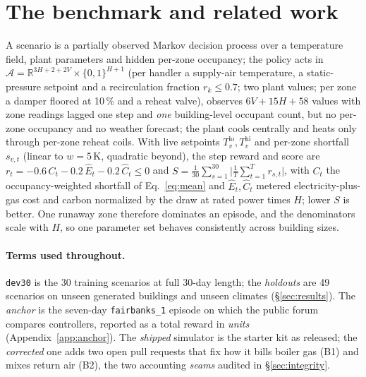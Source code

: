 \documentclass{article}
\newcommand{\cn}[1]{\texttt{#1}}
\begin{document}
\section{The benchmark and related work}
\label{sec:setting}

A scenario is a partially observed Markov decision process over a temperature field, plant
parameters and hidden per-zone occupancy; the policy acts in
$\mathcal{A}=\mathbb{R}^{3H+2+2V}\times\{0,1\}^{H+1}$ (per handler a supply-air
temperature, a static-pressure setpoint and a recirculation fraction $r_k\le0.7$; two plant
values; per zone a damper floored at 10\,\% and a reheat valve), observes $6V+15H+58$ values
with zone readings lagged one step and \emph{one} building-level occupant count, but no
per-zone occupancy and no weather forecast; the plant cools centrally and heats only through
per-zone reheat coils. With live setpoints $T^{\text{lo}}_v,T^{\text{hi}}_v$ and
per-zone shortfall $s_{v,t}$ (linear to $w=5$\,K, quadratic beyond), the step reward and
score are $r_t=-0.6\,C_t-0.2\,\hat E_t-0.2\,\hat C_t\le0$ and
$S=\frac{1}{30}\sum_{s=1}^{30}\big|\tfrac1T\sum_{t=1}^{T}r_{s,t}\big|$, with $C_t$ the
occupancy-weighted shortfall of Eq.~\eqref{eq:mean} and $\hat E_t,\hat C_t$ metered
electricity-plus-gas cost and carbon normalized by the draw at rated power times $H$; lower
$S$ is better. One runaway zone therefore dominates an episode, and the denominators scale
with $H$, so one parameter set behaves consistently across building sizes.

\paragraph{Terms used throughout.} \cn{dev30} is the 30 training scenarios at full 30-day
length; the \emph{holdouts} are 49 scenarios on unseen generated buildings and unseen climates
(\S\ref{sec:results}). The \emph{anchor} is the seven-day \cn{fairbanks\_1} episode on which the
public forum compares controllers, reported as a total reward in \emph{units}
(Appendix~\ref{app:anchor}). The \emph{shipped} simulator is the starter kit as released; the
\emph{corrected} one adds two open pull requests that fix how it bills boiler gas (B1) and mixes
return air (B2), the two accounting \emph{seams} audited in \S\ref{sec:integrity}.
\end{document}
